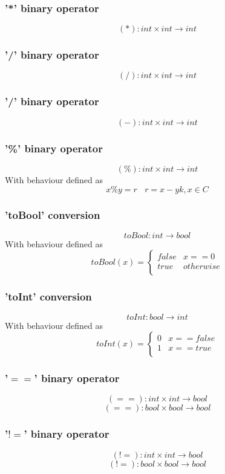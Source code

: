 \documentclass{article}
\begin{document}
\subsubsection{'*' binary operator}
$$
(*): int \times int \longrightarrow int
$$

\subsubsection{'/' binary operator}
$$
(/): int \times int \longrightarrow int
$$

\subsubsection{'/' binary operator}
$$
(-): int \times int \longrightarrow int
$$
\subsubsection{'\%' binary operator}
$$
(\%): int \times int \longrightarrow int
$$
With behaviour defined as
$$
x\%y = r \ \ \ \ r = x - yk, x \in C
$$

\subsubsection{'toBool' conversion}
$$
toBool: int \longrightarrow bool
$$
With behaviour defined as
$$
toBool(x) =  \left\{ \begin{array}{ll}
false & x == 0  \\
true & otherwise \\
\end{array} \right.
$$

\subsubsection{'toInt' conversion}
$$
toInt: bool \longrightarrow int
$$
With behaviour defined as
$$
toInt(x) =  \left\{ \begin{array}{ll}
0 & x == false  \\
1 & x == true \\
\end{array} \right.
$$
\subsubsection{'$==$' binary operator}
$$
(==): int \times int \longrightarrow bool
$$
$$
(==): bool \times bool \longrightarrow bool
$$
\subsubsection{'$!=$' binary operator}
$$
(!=): int \times int \longrightarrow bool
$$
$$
(!=): bool \times bool \longrightarrow bool
$$
\end{document}
